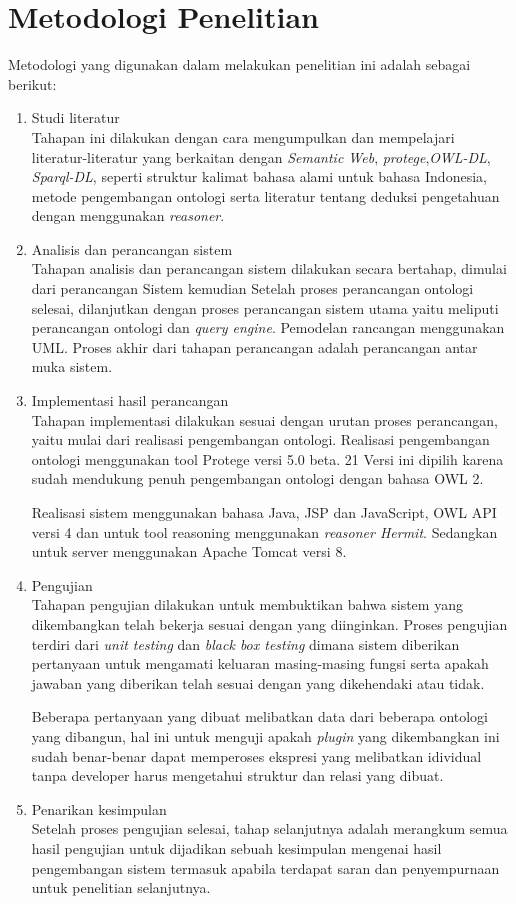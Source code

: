 \section{Metodologi Penelitian}
Metodologi yang digunakan dalam melakukan penelitian ini adalah sebagai berikut:
\begin{enumerate}
	\item Studi literatur\\
	Tahapan ini dilakukan dengan cara mengumpulkan dan mempelajari literatur-literatur yang berkaitan dengan \emph{Semantic Web}, \emph{protege},\emph{OWL-DL}, \emph{Sparql-DL}, seperti struktur kalimat bahasa alami untuk bahasa Indonesia, metode pengembangan ontologi serta literatur tentang deduksi pengetahuan dengan menggunakan \emph{reasoner}.
	\item Analisis dan perancangan sistem\\
	Tahapan analisis dan perancangan sistem dilakukan secara bertahap, dimulai dari perancangan Sistem kemudian	Setelah proses perancangan ontologi selesai, dilanjutkan dengan proses perancangan sistem utama yaitu meliputi perancangan ontologi dan \emph{query engine}. Pemodelan rancangan menggunakan UML. Proses akhir dari tahapan perancangan adalah perancangan antar muka sistem.
	\item Implementasi hasil perancangan\\
	Tahapan implementasi dilakukan sesuai dengan urutan proses perancangan, yaitu mulai dari realisasi pengembangan ontologi. Realisasi pengembangan ontologi menggunakan tool Protege versi 5.0 beta. 21 Versi ini dipilih karena sudah mendukung penuh pengembangan ontologi dengan bahasa OWL 2.

	Realisasi sistem menggunakan bahasa Java, JSP dan JavaScript, OWL API versi 4 dan untuk tool reasoning menggunakan \emph{reasoner Hermit}. Sedangkan untuk server menggunakan Apache Tomcat versi 8.
	\item Pengujian\\
	Tahapan pengujian dilakukan untuk membuktikan bahwa sistem yang dikembangkan telah bekerja sesuai dengan yang diinginkan. Proses pengujian terdiri dari \emph{unit testing} dan \emph{black box testing} dimana sistem diberikan pertanyaan untuk mengamati keluaran masing-masing fungsi serta apakah jawaban yang diberikan telah sesuai dengan yang dikehendaki atau tidak.

	Beberapa pertanyaan yang dibuat melibatkan data dari beberapa ontologi yang dibangun, hal ini untuk menguji apakah \emph{plugin} yang dikembangkan ini sudah benar-benar dapat memperoses ekspresi yang melibatkan idividual tanpa developer harus mengetahui struktur dan relasi yang dibuat.
	\item Penarikan kesimpulan\\
	Setelah proses pengujian selesai, tahap selanjutnya adalah merangkum semua hasil pengujian untuk dijadikan sebuah kesimpulan mengenai hasil pengembangan sistem termasuk apabila terdapat saran dan penyempurnaan untuk penelitian selanjutnya.
\end{enumerate}